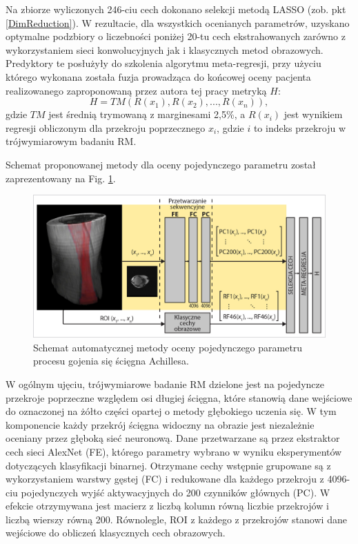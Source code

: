 Na zbiorze wyliczonych 246-ciu cech dokonano selekcji metodą LASSO (zob. pkt \ref{DimReduction}). W rezultacie, dla wszystkich ocenianych parametrów, uzyskano optymalne podzbiory o liczebności poniżej 20-tu cech ekstrahowanych zarówno z wykorzystaniem sieci konwolucyjnych jak i klasycznych metod obrazowych. Predyktory \linebreak te posłużyły do szkolenia algorytmu meta-regresji, przy użyciu którego wykonana została fuzja prowadząca do końcowej oceny pacjenta realizowanego zaproponowaną przez autora tej pracy metryką $H$:
\begin{equation}
\label{ecq:H}
H = TM(R(x_1), R(x_2),..., R(x_n)),
\end{equation}
gdzie $TM$ jest średnią trymowaną z marginesami 2,5\%, a $R(x_i)$ jest wynikiem regresji obliczonym dla przekroju poprzecznego $x_i$, gdzie $i$ to indeks przekroju w trójwymiarowym badaniu RM.

Schemat proponowanej metody dla oceny pojedynczego parametru został zaprezentowany na Fig. \ref{fig:net}. 
\begin{figure}[h!]
	\includegraphics[width=\textwidth]{figures/net.jpg}
	\caption{Schemat automatycznej metody oceny pojedynczego parametru procesu gojenia się ścięgna Achillesa.} \label{fig:net}
\end{figure}

W ogólnym ujęciu, trójwymiarowe badanie RM dzielone jest na pojedyncze przekroje poprzeczne względem osi długiej ścięgna, które stanowią dane wejściowe do oznaczonej na żółto części opartej o metody głębokiego uczenia się. W tym komponencie każdy przekrój ścięgna widoczny na obrazie jest niezależnie oceniany przez głęboką sieć neuronową. Dane przetwarzane są przez ekstraktor cech sieci AlexNet (FE), którego parametry wybrano w wyniku eksperymentów dotyczących klasyfikacji binarnej. Otrzymane cechy wstępnie grupowane są z wykorzystaniem warstwy gęstej (FC) i redukowane dla każdego przekroju z 4096-ciu pojedynczych wyjść aktywacyjnych do 200 czynników głównych (PC). W efekcie otrzymywana jest macierz z liczbą kolumn równą liczbie przekrojów i liczbą wierszy równą 200. Równolegle, ROI z każdego z przekrojów stanowi dane wejściowe do obliczeń klasycznych cech obrazowych. 

